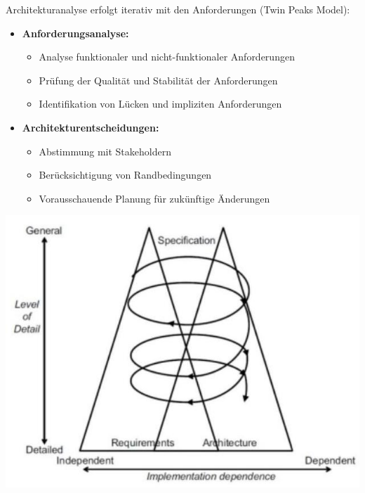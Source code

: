 \begin{concept}{Architekturanalyse}
erfolgt iterativ mit den Anforderungen (Twin Peaks Model):

\begin{itemize}
    \item \textbf{Anforderungsanalyse:}
    \begin{itemize}
        \item Analyse funktionaler und nicht-funktionaler Anforderungen
        \item Prüfung der Qualität und Stabilität der Anforderungen
        \item Identifikation von Lücken und impliziten Anforderungen
    \end{itemize}
    
    \item \textbf{Architekturentscheidungen:}
    \begin{itemize}
        \item Abstimmung mit Stakeholdern
        \item Berücksichtigung von Randbedingungen
        \item Vorausschauende Planung für zukünftige Änderungen
    \end{itemize}
\end{itemize}

\includegraphics[width=0.9\linewidth]{images/2024_12_29_0d1d7b5551ea1b4b41bdg-08}
\end{concept}

